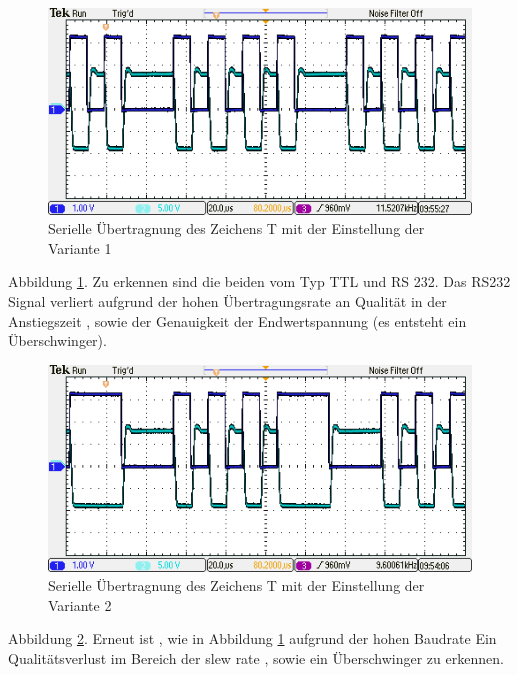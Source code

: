 	\begin{figure}[h]
		\centering
		\includegraphics[width=1\linewidth]{../Bilder/Aufgabe1/Variante1}
		\caption{Serielle Übertragnung des Zeichens T mit der Einstellung der Variante 1}
		\label{fig:variante1}
	\end{figure}
	
	Abbildung \ref{fig:variante1}. Zu erkennen sind die beiden vom Typ TTL und RS 232. Das RS232 Signal verliert aufgrund der hohen Übertragungsrate an Qualität in der Anstiegszeit , sowie der Genauigkeit der Endwertspannung (es entsteht ein Überschwinger).
	
	\newpage
	
	\begin{figure}[h]
		\centering
		\includegraphics[width=1\linewidth]{../Bilder/Aufgabe1/Variante2}
		\caption{Serielle Übertragnung des Zeichens T mit der Einstellung der Variante 2}
		\label{fig:variante2}
	\end{figure}
	
	Abbildung \ref{fig:variante2}. Erneut ist , wie in Abbildung \ref{fig:variante1} aufgrund der hohen Baudrate Ein Qualitätsverlust im Bereich der slew rate , sowie ein Überschwinger zu erkennen.
	
	\newpage
	
